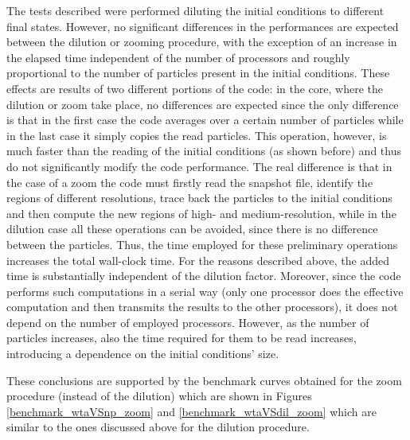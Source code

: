 \documentclass[11pt,a4paper,titlepage]{article}
\begin{document}
The tests described were performed diluting the initial conditions to different final states. However, no significant differences in the performances are expected between the dilution or zooming procedure, with the exception of an increase in the elapsed time independent of the number of processors and roughly proportional to the number of particles present in the initial conditions. These effects are results of two different portions of the code: in the core, where the dilution or zoom take place, no differences are expected since the only difference is that in the first case the code averages over a certain number of particles while in the last case it simply copies the read particles. This operation, however, is much faster than the reading of the initial conditions (as shown before) and thus do not significantly modify the code performance. The real difference is that in the case of a zoom the code must firstly read the snapshot file, identify the regions of different resolutions, trace back the particles to the initial conditions and then compute the new regions of high- and medium-resolution, while in the dilution case all these operations can be avoided, since there is no difference between the particles. Thus, the time employed for these preliminary operations increases the total wall-clock time. For the reasons described above, the added time is substantially independent of the dilution factor. Moreover, since the code performs such computations in a serial way (only one processor does the effective computation and then transmits the results to the other processors), it does not depend on the number of employed processors. However, as the number of particles increases, also the time required for them to be read increases, introducing a dependence on the initial conditions' size.

These conclusions are supported by the benchmark curves obtained for the zoom procedure (instead of the dilution) which are shown in Figures \ref{benchmark_wtaVSnp_zoom} and \ref{benchmark_wtaVSdil_zoom} which are similar to the ones discussed above for the dilution procedure.
\end{document}
